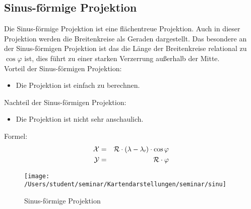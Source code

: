 \subsection{Sinus-förmige Projektion}
\label{sec:sinusodial}
Die Sinus-förmige Projektion ist eine flächentreue Projektion. Auch in dieser Projektion werden die Breitenkreise als Geraden dargestellt. Das besondere an der Sinus-förmigen Projektion ist das die Länge der Breitenkreise relational zu $\cos\varphi$ ist, dies führt zu einer starken Verzerrung außerhalb der Mitte.\\
Vorteil der Sinus-förmigen Projektion:\\
\begin{itemize}
\item Die Projektion ist einfach zu berechnen.
\end{itemize}
Nachteil der Sinus-förmigen Projektion:\\
\begin{itemize}
\item Die Projektion ist nicht sehr anschaulich.
\end{itemize}
Formel:\\
\begin{eqnarray*}
\mathcal {X} & = &\cal{R}\cdot(\lambda - \lambda _0)\cdot \cos \varphi \\
\mathcal{Y} & = &\cal{R} \cdot \varphi
\end{eqnarray*}

\begin{figure}[hbtp]
\centering
\texttt{[image: /Users/student/seminar/Kartendarstellungen/seminar/sinu]} 
\caption{Sinus-förmige Projektion}
\end{figure}
\newpage 